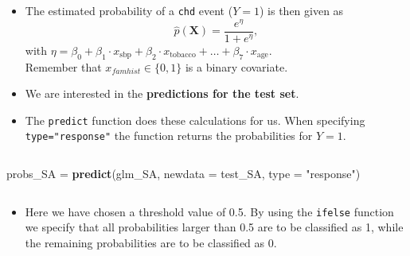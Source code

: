 \documentclass[10pt,ignorenonframetext,]{beamer}
\newenvironment{Shaded}{\begin{snugshade}}{\end{snugshade}}
\newcommand{\DataTypeTok}[1]{\textcolor[rgb]{0.13,0.29,0.53}{#1}}
\newcommand{\KeywordTok}[1]{\textcolor[rgb]{0.13,0.29,0.53}{\textbf{#1}}}
\newcommand{\NormalTok}[1]{#1}
\newcommand{\StringTok}[1]{\textcolor[rgb]{0.31,0.60,0.02}{#1}}
\providecommand{\tightlist}{%
  \setlength{\itemsep}{0pt}\setlength{\parskip}{0pt}}
\begin{document}
\begin{frame}[fragile]

\begin{itemize}
\tightlist
\item
  The estimated probability of a \texttt{chd} event (\(Y=1\)) is then
  given as \[\hat{p}(\mathbf{X}) =\frac{e^\eta}{1+e^\eta} ,\] with
  \(\eta=\beta_0 + \beta_1 \cdot x_{\text{sbp}} + \beta_2\cdot x_{\text{tobacco}} + \ldots + \beta_7\cdot x_{\text{age}}\).\\
  Remember that \(x_{famhist} \in \{0,1\}\) is a binary covariate.
\end{itemize}

\vspace{2mm}

\begin{itemize}
\tightlist
\item
  We are interested in the \textbf{predictions for the test set}.
\end{itemize}

\end{frame}

\begin{frame}[fragile]

\begin{itemize}
\tightlist
\item
  The \texttt{predict} function does these calculations for us. When
  specifying \texttt{type="response"} the function returns the
  probabilities for \(Y=1\).
\end{itemize}

\(~\)

\scriptsize

\begin{Shaded}
\begin{Highlighting}[]
\NormalTok{probs_SA =}\StringTok{ }\KeywordTok{predict}\NormalTok{(glm_SA, }\DataTypeTok{newdata =}\NormalTok{ test_SA, }\DataTypeTok{type =} \StringTok{"response"}\NormalTok{)}
\end{Highlighting}
\end{Shaded}

\(~\)

\normalsize

\begin{itemize}
\tightlist
\item
  Here we have chosen a threshold value of 0.5. By using the
  \texttt{ifelse} function we specify that all probabilities larger than
  0.5 are to be classified as 1, while the remaining probabilities are
  to be classified as 0.
\end{itemize}

\end{frame}
\end{document}
